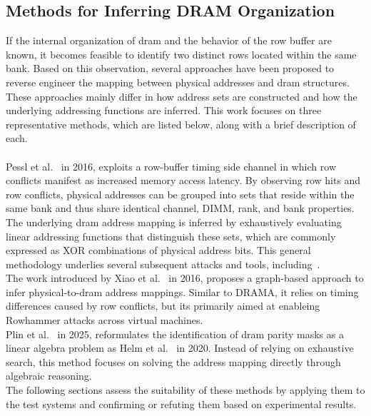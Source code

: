     \subsection{Methods for Inferring DRAM Organization} \label{subsec:methods}
        If the internal organization of \gls{dram} and the behavior of the row buffer are known, it becomes 
        feasible to identify two distinct rows located within the same bank. Based on this observation, 
        several approaches have been proposed to reverse engineer the mapping between physical addresses 
        and \gls{dram} structures. These approaches mainly differ in how address sets are constructed and how 
        the underlying addressing functions are inferred. This work focuses on three representative methods, which
        are listed below, along with a brief description of each.
        \\ \\
        Pessl et al.~\cite{paperDRAMA} in 2016, exploits a row-buffer timing side channel in which 
        row conflicts manifest as increased memory access latency. By observing row hits and row conflicts, physical 
        addresses can be grouped into sets that reside within the same bank and thus share identical channel, DIMM, 
        rank, and bank properties. The underlying \gls{dram} address mapping is inferred by exhaustively evaluating 
        linear addressing functions that distinguish these sets, which are commonly expressed as XOR combinations of 
        physical address bits. This general methodology underlies several subsequent attacks and tools, 
        including~\cite{paperHalfDouble, toolHalfDouble, paperDrammer, toolDrammer, thesisCacheAttacksandRH}.
        \\
        The work introduced by Xiao et al.~\cite{paperOneBitFlipsOneCouldFlops} in 2016, proposes a 
        graph-based approach to infer physical-to-\gls{dram} address mappings. Similar to DRAMA, it relies on 
        timing differences caused by row conflicts, but its primarily aimed at enableing Rowhammer attacks 
        across virtual machines.
        \\
        Plin et al.~\cite{paperKnockKnock} in 2025, reformulates the identification of \gls{dram} parity 
        masks as a linear algebra problem as Helm et al.~\cite{paperReliableReverseEngineering} in 2020. Instead of relying on exhaustive search, this method focuses on 
        solving the address mapping directly through algebraic reasoning.
        \\
        The following sections assess the suitability of these methods by applying them to the test systems and confirming 
        or refuting them based on experimental results.

    

    
